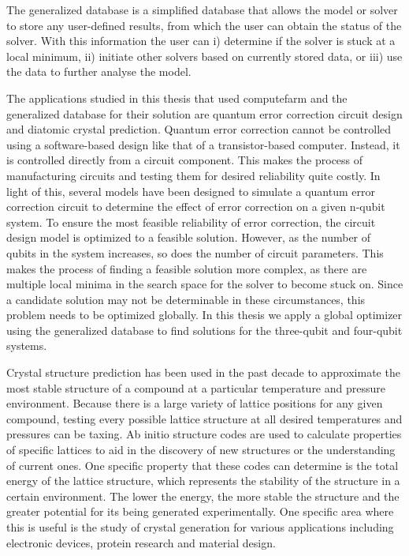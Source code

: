 The generalized database is a simplified database that allows the model or solver to store any user-defined results, from which the user can obtain the status of the solver. With this information the user can i) determine if the solver is stuck at a local minimum, ii) initiate other solvers based on currently stored data, or iii) use the data to further analyse the model. 

The applications studied in this thesis that used computefarm and the generalized database for their solution are quantum error correction circuit design and diatomic crystal prediction. Quantum error correction cannot be controlled using a software-based design like that of a transistor-based computer. Instead, it is controlled directly from a circuit component. This makes the process of manufacturing circuits and testing them for desired reliability quite costly. In light of this, several models have been designed to simulate a quantum error correction circuit to determine the effect of error correction on a given n-qubit system. To ensure the most feasible reliability of error correction, the circuit design model is optimized to a feasible solution. However, as the number of qubits in the system increases, so does the number of circuit parameters. This makes the process of finding a feasible solution more complex, as there are multiple local minima in the search space for the solver to become stuck on. Since a candidate solution may not be determinable in these circumstances, this problem needs to be optimized globally. In this thesis we apply a global optimizer using the generalized database to find solutions for the three-qubit and four-qubit systems. 

Crystal structure prediction has been used in the past decade to approximate the most stable structure of a compound at a particular temperature and pressure environment. Because there is a large variety of lattice positions for any given compound, testing every possible lattice structure at all desired temperatures and pressures can be taxing. Ab initio structure codes are used to calculate properties of specific lattices to aid in the discovery of new structures or the understanding of current
ones. One specific property that these codes can determine is the total energy of the lattice structure, which represents the stability of the structure in a certain environment. The lower the energy, the more stable the structure and the greater potential for its being generated experimentally. One specific area where this is useful is the study of crystal generation for various applications including electronic devices, protein research and material design. 

